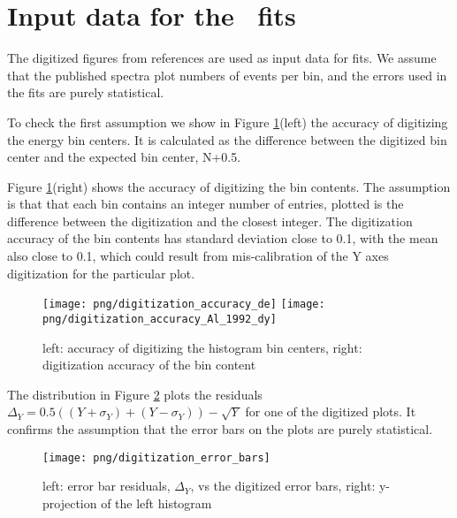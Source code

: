 \section { Input data for the \kmax\ fits}

The digitized figures from references \cite{RMC_1992_PhysRevC.46.1094,RMC_1999_PhysRevC.59.2853}
are used as input data for fits. We assume that the published spectra plot numbers of events
per bin, and the errors used in the fits are purely statistical.

To check the first assumption we show in Figure \ref{fig:digitization_accuracy_x_y}(left) the accuracy
of digitizing the energy bin centers. It is calculated as the difference between the digitized
bin center and the expected bin center, N+0.5.

Figure \ref{fig:digitization_accuracy_x_y}(right) shows the accuracy of digitizing the bin contents.
The assumption is that that each bin contains an integer number of entries, plotted is the difference
between the digitization and the closest integer. The digitization accuracy of the bin contents has
standard deviation close to 0.1, with the mean also close to 0.1, which could result from
mis-calibration of the Y axes digitization for the particular plot.

\begin{figure}[htbp]
  \begin{center}
    \texttt{[image: png/digitization\_accuracy\_de]} 
    \texttt{[image: png/digitization\_accuracy\_Al\_1992\_dy]} 
  \end{center}
  \caption{
    left: accuracy of digitizing the histogram bin centers,
    right: digitization accuracy of the bin content
  }
  \label{fig:digitization_accuracy_x_y}
\end{figure}

The distribution in Figure \ref{fig:digitization_accuracy_error_bars} plots the residuals
$\Delta_Y = 0.5((Y+\sigma_Y) + (Y-\sigma_Y)) - \sqrt{Y}$ for one of the digitized plots.
It confirms the assumption that the error bars on the plots are purely statistical.

\begin{figure}[htbp]
  \begin{center}
    \texttt{[image: png/digitization\_error\_bars]} 
  \end{center}
  \caption{
    left: error bar residuals, $\Delta_Y$, vs the digitized error bars,
    right: y-projection of the left histogram
  }
  \label{fig:digitization_accuracy_error_bars}
\end{figure}


